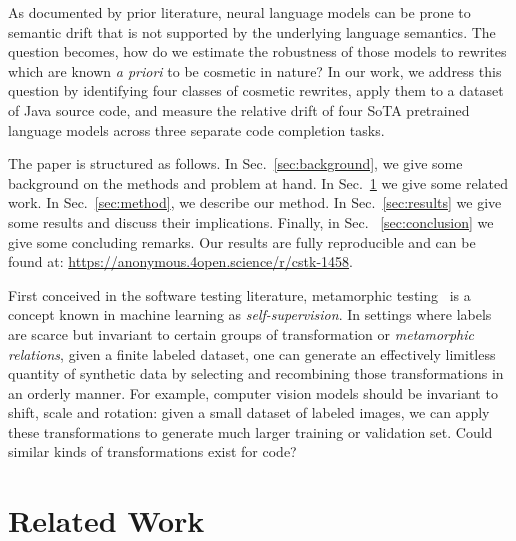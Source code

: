 \documentclass[usenames,dvipsnames]{article} %
\begin{document}
As documented by prior literature, neural language models can be prone to semantic drift that is not supported by the underlying language semantics. The question becomes, how do we estimate the robustness of those models to rewrites which are known \textit{a priori} to be cosmetic in nature? In our work, we address this question by identifying four classes of cosmetic rewrites, apply them to a dataset of Java source code, and measure the relative drift of four SoTA pretrained language models across three separate code completion tasks.

The paper is structured as follows. In Sec.~\ref{sec:background}, we give some background on the methods and problem at hand. In Sec.~\ref{sec:related_work} we give some related work. In Sec.~\ref{sec:method}, we describe our method. In Sec.~\ref{sec:results} we give some results and discuss their implications. Finally, in Sec. ~\ref{sec:conclusion} we give some concluding remarks. Our results are fully reproducible and can be found at: \url{https://anonymous.4open.science/r/cstk-1458}.



First conceived in the software testing literature, metamorphic testing~\cite{chen1995metamorphic} is a concept known in machine learning as \textit{self-supervision}. In settings where labels are scarce but invariant to certain groups of transformation or \textit{metamorphic relations}, given a finite labeled dataset, one can generate an effectively limitless quantity of synthetic data by selecting and recombining those transformations in an orderly manner. For example, computer vision models should be invariant to shift, scale and rotation: given a small dataset of labeled images, we can apply these transformations to generate much larger training or validation set. Could similar kinds of transformations exist for code?

  \section{Related Work}\label{sec:related_work}
\end{document}

